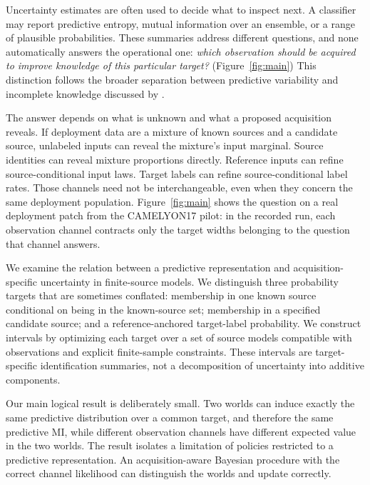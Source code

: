 \documentclass[11pt]{article}
\begin{document}
Uncertainty estimates are often used to decide what to inspect next. A classifier may report predictive entropy, mutual information over an ensemble, or a range of plausible probabilities. These summaries address different questions, and none automatically answers the operational one: \emph{which observation should be acquired to improve knowledge of this particular target?} (Figure~\ref{fig:main}) This distinction follows the broader separation between predictive variability and incomplete knowledge discussed by \citet{hullermeier2021}.

The answer depends on what is unknown and what a proposed acquisition reveals. If deployment data are a mixture of known sources and a candidate source, unlabeled inputs can reveal the mixture's input marginal. Source identities can reveal mixture proportions directly. Reference inputs can refine source-conditional input laws. Target labels can refine source-conditional label rates. Those channels need not be interchangeable, even when they concern the same deployment population. Figure~\ref{fig:main} shows the question on a real deployment patch from the CAMELYON17 pilot: in the recorded run, each observation channel contracts only the target widths belonging to the question that channel answers.

We examine the relation between a predictive representation and acquisition-specific uncertainty in finite-source models. We distinguish three probability targets that are sometimes conflated: membership in one known source conditional on being in the known-source set; membership in a specified candidate source; and a reference-anchored target-label probability. We construct intervals by optimizing each target over a set of source models compatible with observations and explicit finite-sample constraints. These intervals are target-specific identification summaries, not a decomposition of uncertainty into additive components.

Our main logical result is deliberately small. Two worlds can induce exactly the same predictive distribution over a common target, and therefore the same predictive MI, while different observation channels have different expected value in the two worlds. The result isolates a limitation of policies restricted to a predictive representation. An acquisition-aware Bayesian procedure with the correct channel likelihood can distinguish the worlds and update correctly.
\end{document}
